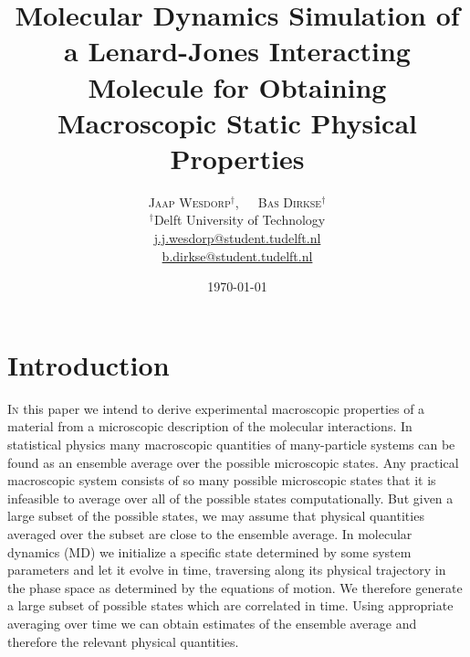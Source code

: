 \documentclass[twoside]{article}
\title{\vspace{-15mm}\fontsize{18pt}{10pt}\selectfont\textbf{Molecular Dynamics Simulation of a Lenard-Jones Interacting Molecule for Obtaining Macroscopic Static Physical Properties}} %
\author{
	\large
	\textsc{Jaap Wesdorp}$^\dagger$, $\hspace{10pt}$ \textsc{Bas Dirkse}$^\dagger$ \\ %
	\normalsize $^\dagger$Delft University of Technology \\ %
	\normalsize \href{mailto:j.j.wesdorp@student.tudelft.nl}{j.j.wesdorp@student.tudelft.nl} \\
	\normalsize \href{mailto:b.dirkse@student.tudelft.nl}{b.dirkse@student.tudelft.nl} 
}
\date{\today\vspace{-8mm}}
\begin{document}
	
	
	
	\maketitle %
	\thispagestyle{firststyle} %
	
	
	\begin{abstract}
		\noindent  \lipsum[1]
		
	\end{abstract}
	
	
	\section{Introduction}
	
	\lettrine[nindent=1em,lines=2]{I}
	n this paper we intend to derive experimental macroscopic properties of a material from a microscopic description of the molecular interactions. In statistical physics many macroscopic quantities of many-particle systems can be found as an ensemble average over the possible microscopic states. Any practical macroscopic system consists of so many possible microscopic states that it is infeasible to average over all of the possible states computationally. But given a large subset of the possible states, we may assume that physical quantities averaged over the subset are close to the ensemble average. In molecular dynamics (MD) we initialize a specific state determined by some system parameters and let it evolve in time, traversing along its physical trajectory in the phase space as determined by the equations of motion. We therefore generate a large subset of possible states which are correlated in time. Using appropriate averaging over time we can obtain estimates of the ensemble average and therefore the relevant physical quantities.
	
\end{document}
